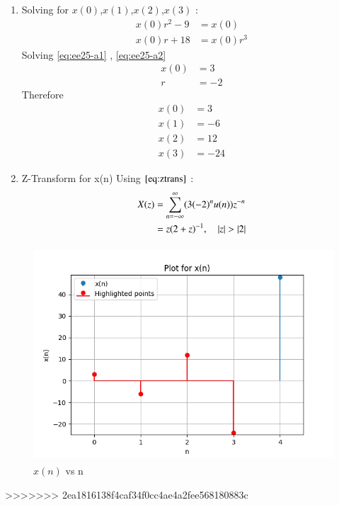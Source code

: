\documentclass[journal,12pt,onecolumn]{IEEEtran}
\theoremstyle{remark}
\begin{document}
\begin{enumerate}
    \item Solving for $x(0)$,$x(1)$,$x(2)$,$x(3)$ :
   \begin{align}
x(0)r^2 - 9 &= x(0) \label{eq:ee25-a1}\\
x(0)r + 18 &= x(0)r^3\label{eq:ee25-a2}
\end{align}
Solving  \eqref{eq:ee25-a1} , \eqref{eq:ee25-a2}
\begin{align}
    x(0) &= 3\\
    r &= -2
\end{align}
Therefore 
\begin{align}
    x(0) &= 3\\
    x(1) &= -6\\
    x(2) &= 12\\
    x(3) &= -24
     \end{align}

    \item Z-Transform for x(n) 
    Using $\eqref{eq:ztrans}$ :
    \begin{align}
    X(z) &= \sum_{n=-\infty}^{\infty}(3(-2)^nu(n))z^{-n} \\
    &= z(2+z)^{-1} ,\quad \left\vert z\right\vert>\left\vert2\right\vert 
    \end{align}
    
\end{enumerate}
    \begin{figure}[!ht]
    \centering
\graphicspath{ {figs/} }
\includegraphics[width=12cm, height=8cm]{graph_1}
\caption{ $x(n)$ vs n }
\label{graph:ee25-ag2}
\end{figure}
\vspace{0.5cm}


>>>>>>> 2ea1816138f4caf34f0cc4ae4a2fee568180883c





 
\end{document}
